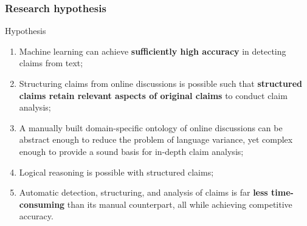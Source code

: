 \documentclass{beamer}
\begin{document}
\begin{frame}
	\frametitle{Research hypothesis}
\begin{block}{Hypothesis}
	\begin{enumerate}
	\item Machine learning can achieve \textbf{sufficiently high accuracy} in
		detecting claims from text;
	\item Structuring claims from online discussions is possible such that
		\textbf{structured claims retain relevant aspects of original claims} to
		conduct claim analysis;
	\item A manually built domain-specific ontology of online discussions
		can be abstract enough to reduce the problem of language
		variance, yet complex enough to provide a sound basis for
		in-depth claim analysis;
	\item Logical reasoning is possible with structured claims;
	\item Automatic detection, structuring, and analysis of claims is far
		\textbf{less time-consuming} than its manual counterpart, all while
		achieving competitive accuracy.
	\end{enumerate}
\end{block}

\end{frame}


\end{document}
